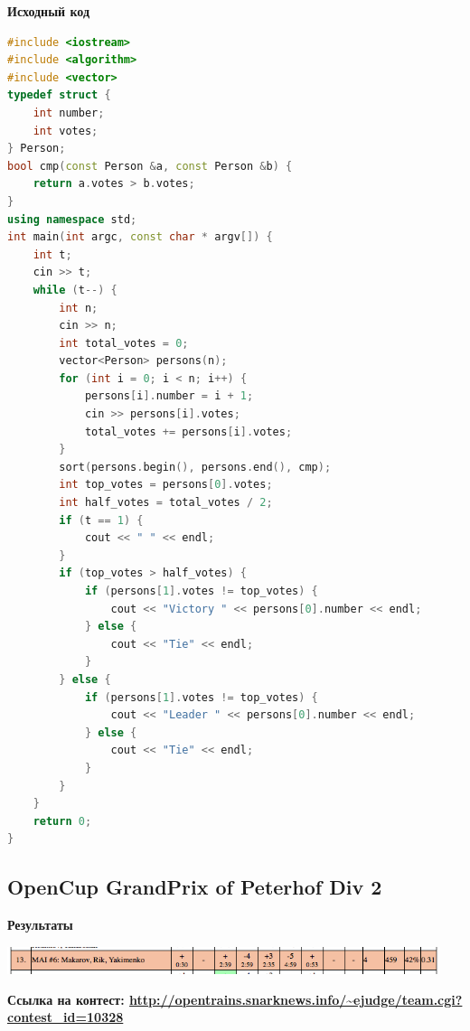 \documentclass[a4paper,12pt]{article}
\begin{document}
\newpage
\textbf{{\large Исходный код}} \\
\begin{lstlisting}[language=C++]
#include <iostream>
#include <algorithm>
#include <vector>
typedef struct {
    int number;
    int votes;
} Person;
bool cmp(const Person &a, const Person &b) {
    return a.votes > b.votes;
}
using namespace std;
int main(int argc, const char * argv[]) {
    int t;
    cin >> t; 
    while (t--) {
        int n;
        cin >> n;
        int total_votes = 0;
        vector<Person> persons(n);
        for (int i = 0; i < n; i++) {
            persons[i].number = i + 1;
            cin >> persons[i].votes;
            total_votes += persons[i].votes;
        }
        sort(persons.begin(), persons.end(), cmp);
        int top_votes = persons[0].votes;
        int half_votes = total_votes / 2;
        if (t == 1) {
            cout << " " << endl;
        }
        if (top_votes > half_votes) {
            if (persons[1].votes != top_votes) {
                cout << "Victory " << persons[0].number << endl;
            } else {
                cout << "Tie" << endl;
            }
        } else {
            if (persons[1].votes != top_votes) {
                cout << "Leader " << persons[0].number << endl;
            } else {
                cout << "Tie" << endl;
            }
        }
    }
    return 0;
}
\end{lstlisting}






%
%
\newpage
\subsection{OpenCup GrandPrix of Peterhof Div 2}

\textbf{{\large Результаты}} \\
\begin{center}
\includegraphics[width=0.95\textwidth]{OC_Peterhof/result.png}\\ [1cm]
\end{center}

\textbf{{\large Ссылка на контест: \url{http://opentrains.snarknews.info/~ejudge/team.cgi?contest_id=10328}}}
\end{document}
